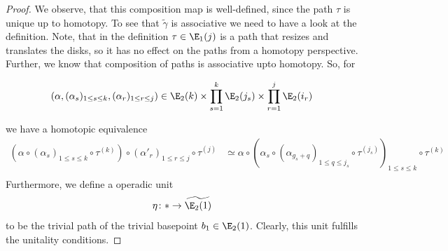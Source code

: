 \begin{proof}
    We observe, that this composition map is well-defined, since the path $\tau$ is unique up to homotopy. To see that 
    $\widetilde{\gamma}$ is associative we need to have a look at the definition.
    Note, that in the definition $\tau \in \E_1(j)$ is a path that resizes and translates the disks, so
    it has no effect on the paths from a homotopy perspective. Further, we know that composition of paths is associative upto homotopy.
    So, for 

    $$(\alpha, (\alpha_s)_{1 \leq s \leq k}, (\alpha_r)_{1 \leq r \leq j}) \in \E_2(k) \times \prod_{s=1}^{k} \E_2(j_s) \times \prod_{r=1}^{j} \E_2(i_r)$$

    we have a homotopic equivalence
    \begin{align*}
        (\alpha \circ (\alpha_s)_{1 \leq s \leq k} \circ \tau^{(k)}) \circ (\alpha'_r)_{1 \leq r \leq j} \circ \tau^{(j)} 
        &\simeq 
        \alpha \circ (\alpha_s \circ (\alpha_{g_s+q})_{1 \leq q \leq j_s} \circ \tau^{(j_s)})_{1 \leq s \leq k} \circ \tau^{(k)} \\
    \end{align*}
    Furthermore, we define a operadic unit
    \[
        \eta \colon \ast \to \widetilde{\E_2(1)}
    \]
    to be the trivial path of the trivial basepoint $b_1 \in \E_2(1)$. Clearly, this unit fulfills the unitality conditions.


\end{proof}
